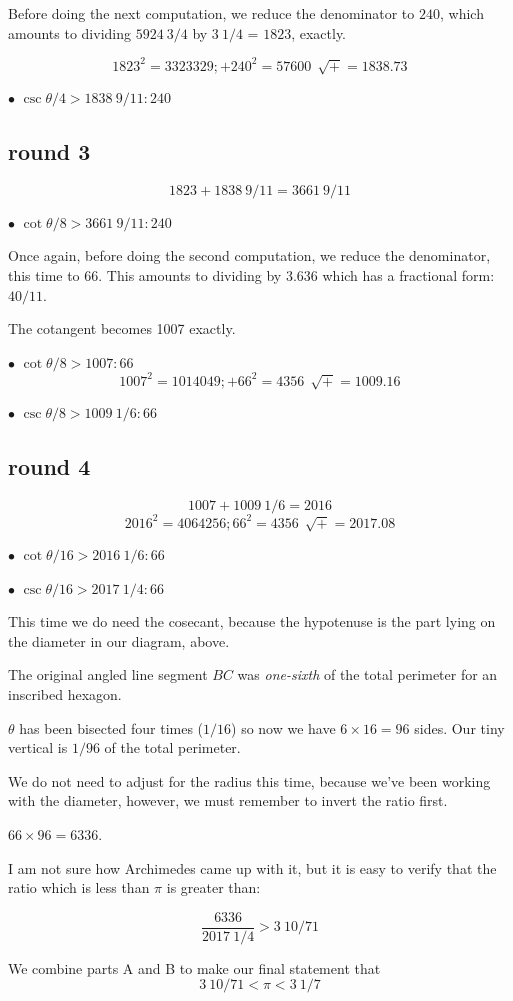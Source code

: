 \documentclass[11pt, oneside]{article}
\begin{document}
Before doing the next computation, we reduce the denominator to $240$, which amounts to dividing $5924 \ 3/4$ by $3 \ 1/4$ = $1823$, exactly.

\[ 1823^2 = 3323329;  + 240^2 = 57600 \ \ \sqrt{+} = 1838.73 \]

$\bullet$  $\csc \theta/4 > 1838 \ 9/11: 240$

\subsection*{round 3}
\[ 1823 + 1838 \ 9/11 = 3661 \ 9/11 \]

$\bullet$  $\cot \theta/8 > 3661 \ 9/11 : 240$ 

Once again, before doing the second computation, we reduce the denominator, this time to $66$.  This amounts to dividing by $3.636$ which has a fractional form:  $40/11$.

The cotangent becomes 1007 exactly.

$\bullet$  $\cot \theta/8 > 1007 : 66$ 
\[ 1007^2 = 1014049;  + 66^2 = 4356 \ \ \sqrt{+} = 1009.16 \]

$\bullet$  $\csc \theta/8 > 1009 \ 1/6 : 66$

\subsection*{round 4}
\[ 1007 + 1009 \ 1/6 = 2016 \]
\[ 2016^2 = 4064256;  66^2 = 4356 \ \ \sqrt{+} = 2017.08 \]

$\bullet$  $\cot \theta/16 > 2016 \ 1/6 : 66$ 

$\bullet$  $\csc \theta/16 > 2017 \ 1/4: 66$

This time we do need the cosecant, because the hypotenuse is the part lying on the diameter in our diagram, above.

The original angled line segment $BC$ was \emph{one-sixth} of the total perimeter for an inscribed hexagon.

$\theta$ has been bisected four times ($1/16$) so now we have $6 \times 16 = 96$ sides.  Our tiny vertical is $1/96$ of the total perimeter.

We do not need to adjust for the radius this time, because we've been working with the diameter, however, we must remember to invert the ratio first.

$66 \times 96 = 6336$.

I am not sure how Archimedes came up with it, but it is easy to verify that the ratio which is less than $\pi$ is greater than:

\[ \frac{6336}{2017 \ 1/4} > 3 \ 10/71 \]

We combine parts A and B to make our final statement that
\[ 3 \ 10/71 < \pi < 3 \ 1/7 \]
\end{document}

